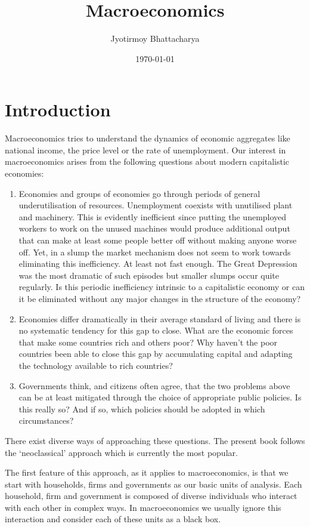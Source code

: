 \documentclass[11pt,reqno,openany]{amsbook}
\title{Macroeconomics}
\author{Jyotirmoy Bhattacharya}
\date{\today}
\begin{document}
\frontmatter

\tableofcontents
\mainmatter
\chapter{Introduction}
Macroeconomics tries to understand the dynamics of economic
aggregates like national income, the price level or the rate of
unemployment. Our interest in macroeconomics arises from the
following questions about modern capitalistic economies:
\begin{enumerate}
\item Economies and groups of economies go through periods of general
  underutilisation of resources. Unemployment coexists
  with unutilised plant and machinery. This is evidently
  inefficient since putting the unemployed workers to work
  on the unused machines would produce additional output
  that can make at least some people better off without
  making anyone worse off. Yet, in a slump the market
  mechanism does not seem to work towards eliminating this
  inefficiency. At least not fast enough. The Great Depression
  was the most dramatic of such episodes but smaller
  slumps occur quite regularly. Is this periodic
  inefficiency intrinsic to a capitalistic economy or can it
  be eliminated without any major changes in the structure
  of the economy?
\item Economies differ dramatically in their average
  standard of living and there is no systematic tendency for
  this gap to close. What are the economic forces that make
  some countries rich and others poor? Why haven't the poor
  countries been able to close this gap by accumulating
  capital and adapting the technology available to rich
  countries?
\item Governments think, and citizens often agree, that the
  two problems above can be at least mitigated through the
  choice of appropriate public policies. Is this really so?
  And if so, which policies should be adopted in which
  circumstances?
\end{enumerate}

There exist diverse ways of approaching these questions. The
present book follows the `neoclassical' approach which is
currently the most popular.

The first feature of this approach, as it applies to
macroeconomics, is that we start with households, firms and
governments as our basic units of analysis. Each household,
firm and government is composed of diverse individuals who
interact with each other in complex ways. In macroeconomics
we usually ignore this interaction and consider each of
these units as a black box.
\end{document}

